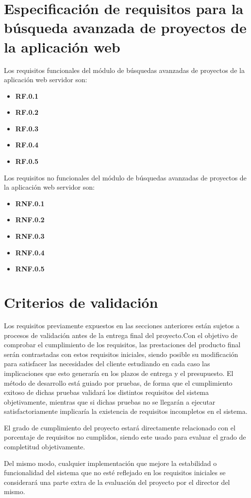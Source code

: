 \section{Especificación de requisitos para la búsqueda avanzada de proyectos de la aplicación web}

Los requisitos funcionales del módulo de búsquedas avanzadas de proyectos de la aplicación web servidor son:

\begin{itemize}
	\item \textbf{RF.0.1}

	\item \textbf{RF.0.2}

	\item \textbf{RF.0.3}

	\item \textbf{RF.0.4}

	\item \textbf{RF.0.5}	
\end{itemize}

Los requisitos no funcionales del módulo de búsquedas avanzadas de proyectos de la aplicación web servidor son:

\begin{itemize}
	\item \textbf{RNF.0.1}

	\item \textbf{RNF.0.2}

	\item \textbf{RNF.0.3}

	\item \textbf{RNF.0.4}

	\item \textbf{RNF.0.5}	
\end{itemize}


\section{Criterios de validación}

Los requisitos previamente expuestos en las secciones anteriores están sujetos a procesos de validación antes de la entrega final del proyecto.Con el objetivo de comprobar el cumplimiento de los requisitos, las prestaciones del producto final serán contrastadas con estos requisitos iniciales, siendo posible su modificación para satisfacer las necesidades del cliente estudiando en cada caso las implicaciones que esto generaría en los plazos de entrega y el presupuesto. El método de desarrollo está guiado por pruebas, de forma que el cumplimiento exitoso de dichas pruebas validará los distintos requisitos del sistema objetivamente, mientras que si dichas pruebas no se llegarán a ejecutar satisfactoriamente implicaría la existencia de requisitos incompletos en el sistema.

El grado de cumplimiento del proyecto estará directamente relacionado con el porcentaje de requisitos no cumplidos, siendo este usado para evaluar el grado de completitud objetivamente.

Del mismo modo, cualquier implementación que mejore la estabilidad o funcionalidad del sistema que no esté reflejado en los requisitos iniciales se considerará una parte extra de la evaluación del proyecto por el director del mismo.